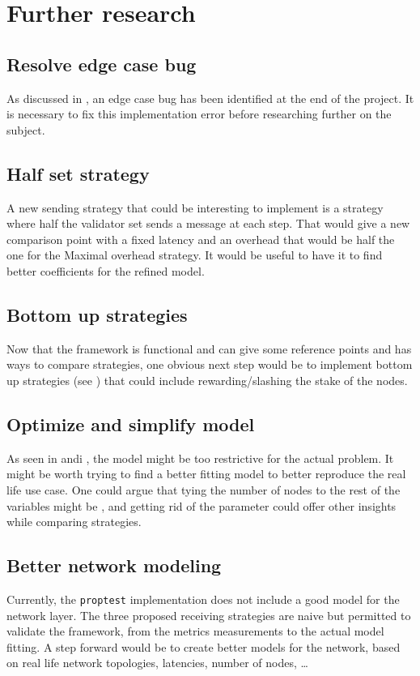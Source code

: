 \FloatBarrier
\section{Further research}
\subsection{Resolve edge case bug}
As discussed in , an edge case bug has been identified at
the end of the project. It is necessary to fix this implementation error
before researching further on the subject.

\subsection{Half set strategy}
A new sending strategy that could be interesting to implement is a strategy
where half the validator set sends a message at each step. That would give a new
comparison point with a fixed latency and an overhead that would be half the one
for the Maximal overhead strategy. It would be useful to have it to find better
coefficients for the refined model.

\subsection{Bottom up strategies}
Now that the framework is functional and can give some reference points and has
ways to compare strategies, one obvious next step would be to implement bottom
up strategies (see ) that could include
rewarding/slashing the stake of the nodes.

\subsection{Optimize and simplify model}
As seen in  andi , the model
might be too restrictive for the actual problem. It might be worth trying to
find a better fitting model to better reproduce the real life use case.
One could argue that tying the number of nodes to the rest of the variables
might be , and getting rid of the parameter could offer other insights
while comparing strategies.

\subsection{Better network modeling}
Currently, the \texttt{proptest} implementation does not include a good model
for the network layer. The three proposed receiving strategies are naive but
permitted to validate the framework, from the metrics measurements to the actual
model fitting. A step forward would be to create better models for the
network, based on real life network topologies, latencies, number of nodes, \ldots

